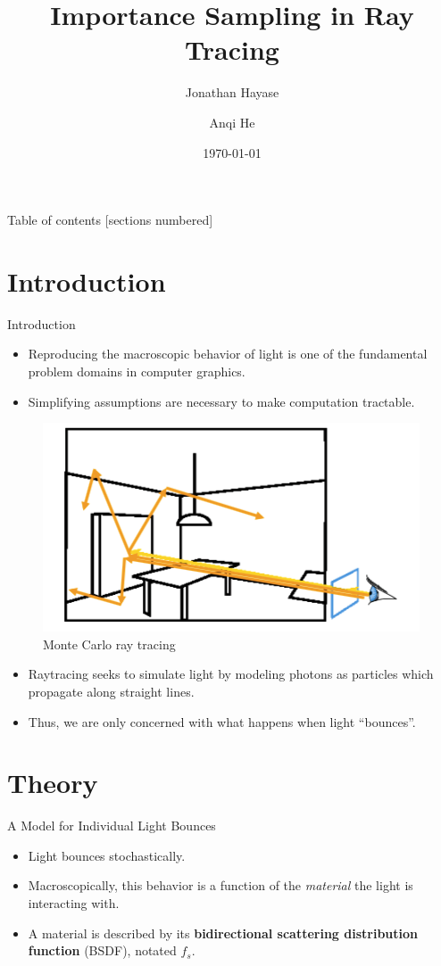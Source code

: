 \documentclass[10pt]{beamer}
\title{Importance Sampling in Ray Tracing}
\subtitle{}
\date{\today}
\author{Jonathan Hayase \and Anqi He}
\institute{Math 164 -- Scientific Computing -- FA18}
\begin{document}
\maketitle

\begin{frame}{Table of contents}
  [sections numbered]
  \tableofcontents[hideallsubsections]
\end{frame}

\section{Introduction}

\begin{frame}{Introduction}
  \begin{itemize}
  \item Reproducing the macroscopic behavior of light is one of the fundamental problem domains in computer graphics.
  \item Simplifying assumptions are necessary to make computation tractable.
  \end{itemize}
\end{frame}

\begin{frame}
\begin{figure}[H]
  \centering
    \includegraphics[width=0.5\linewidth,height=0.5\textheight,keepaspectratio]{intro.png}
    \caption{Monte Carlo ray tracing}
\end{figure}
\begin{itemize}
  \item Raytracing seeks to simulate light by modeling photons as particles which propagate along straight lines.
  \item Thus, we are only concerned with what happens when light ``bounces''.
\end{itemize}
\end{frame}

\section{Theory}
\begin{frame}{A Model for Individual Light Bounces}
  \begin{itemize}
  \item Light bounces stochastically.
  \item Macroscopically, this behavior is a function of the \textit{material} the light is interacting with.
  \item A material is described by its \textbf{bidirectional scattering distribution function} (BSDF), notated \(f_s\).
  \end{itemize}
\end{frame}
\end{document}
